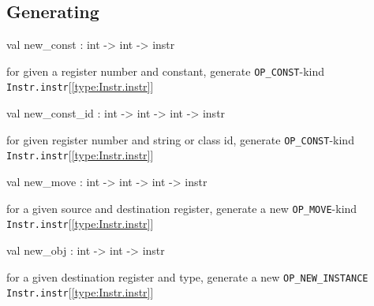 \documentclass[11pt]{article}
\begin{document}
\subsection{Generating}




\label{val:Instr.new-underscoreconst}\begin{ocamldoccode}
val new_const : int -> int -> instr
\end{ocamldoccode}
\begin{ocamldocdescription}
for given a register number and constant,
 generate {\tt{OP\_CONST}}-kind {\tt{Instr.instr}}[\ref{type:Instr.instr}]


\end{ocamldocdescription}




\label{val:Instr.new-underscoreconst-underscoreid}\begin{ocamldoccode}
val new_const_id : int -> int -> int -> instr
\end{ocamldoccode}
\begin{ocamldocdescription}
for given register number and string or class id,
 generate {\tt{OP\_CONST}}-kind {\tt{Instr.instr}}[\ref{type:Instr.instr}]


\end{ocamldocdescription}




\label{val:Instr.new-underscoremove}\begin{ocamldoccode}
val new_move : int -> int -> int -> instr
\end{ocamldoccode}
\begin{ocamldocdescription}
for a given source and destination register,
 generate a new {\tt{OP\_MOVE}}-kind {\tt{Instr.instr}}[\ref{type:Instr.instr}]


\end{ocamldocdescription}




\label{val:Instr.new-underscoreobj}\begin{ocamldoccode}
val new_obj : int -> int -> instr
\end{ocamldoccode}
\begin{ocamldocdescription}
for a given destination register and type,
 generate a new {\tt{OP\_NEW\_INSTANCE}} {\tt{Instr.instr}}[\ref{type:Instr.instr}]


\end{ocamldocdescription}
\end{document}
